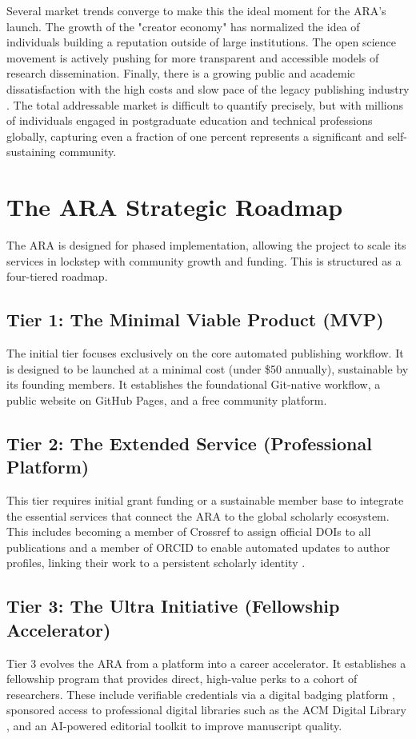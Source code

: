 \documentclass[conference, compsoc, 11pt]{IEEEtran}
\begin{document}
Several market trends converge to make this the ideal moment for the ARA's launch. The growth of the "creator economy" has normalized the idea of individuals building a reputation outside of large institutions. The open science movement is actively pushing for more transparent and accessible models of research dissemination. Finally, there is a growing public and academic dissatisfaction with the high costs and slow pace of the legacy publishing industry \cite{eve2017}. The total addressable market is difficult to quantify precisely, but with millions of individuals engaged in postgraduate education and technical professions globally, capturing even a fraction of one percent represents a significant and self-sustaining community.

\section{The ARA Strategic Roadmap}

The ARA is designed for phased implementation, allowing the project to scale its services in lockstep with community growth and funding. This is structured as a four-tiered roadmap.

\subsection{Tier 1: The Minimal Viable Product (MVP)}
The initial tier focuses exclusively on the core automated publishing workflow. It is designed to be launched at a minimal cost (under \$50 annually), sustainable by its founding members. It establishes the foundational Git-native workflow, a public website on GitHub Pages, and a free community platform.

\subsection{Tier 2: The Extended Service (Professional Platform)}
This tier requires initial grant funding or a sustainable member base to integrate the essential services that connect the ARA to the global scholarly ecosystem. This includes becoming a member of Crossref to assign official DOIs to all publications \cite{lammey2014} and a member of ORCID to enable automated updates to author profiles, linking their work to a persistent scholarly identity \cite{haak2012}.

\subsection{Tier 3: The Ultra Initiative (Fellowship Accelerator)}
Tier 3 evolves the ARA from a platform into a career accelerator. It establishes a fellowship program that provides direct, high-value perks to a cohort of researchers. These include verifiable credentials via a digital badging platform \cite{credly2025}, sponsored access to professional digital libraries such as the ACM Digital Library \cite{acm2025}, and an AI-powered editorial toolkit to improve manuscript quality.
\end{document}
